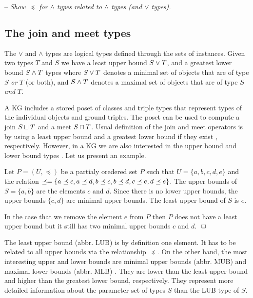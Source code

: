 \documentclass[runningheads]{llncs}
\newcommand{\finbox}{\phantom{.}\hfill\Box}
\newcommand{\memo}[1]{}
\newcommand{\notes}[1]{\noindent\begin{small}-- \emph{#1}\hfill\break\end{small}}
\begin{document}
\notes{Show $\preceq$ for $\land$ types related to $\land$ types (and $\lor$ types).}

\memo{Put together the base types of ground identifiers using $\land$ type.}
\memo{First, the base type of an ground identifier is the $\land$ of all base types.}
\memo{The \emph{base type} of a ground identifier is defined explicitely!}





\subsection{The join and meet types\label{sec:join-meet-types}}

The $\lor$ and $\land$ types are logical types defined through the
sets of instances. Given two types $T$ and $S$ we have a least upper
bound $S\lor\/T$, and a greatest lower bound $S\land\/T$ types where
$S\lor\/T$ denotes a minimal set of objects that are of type $S$
\emph{or} $T$ (or both), and $S\land\/T$ denotes a maximal set of
objects that are of type $S$ \emph{and} $T$.

A KG includes a stored poset of classes and triple types that
represent types of the individual objects and ground triples. The
poset can be used to compute a join $S\sqcup\/T$ and a meet
$S\sqcap\/T$. Usual definition of the join and meet operators is by
using a least upper bound and a greatest lower bound if they exist
\cite{Pierce2002}, respectively. However, in a KG we are also
interested in the upper bound and lower bound types
\cite{DaveyPriestley2002}. Let us present an example.

\begin{example}
  Let $P=(U,\preceq)$ be a partialy oredered set $P$ such that
  $U=\{a,b,c,d,e\}$ and the relation
  $\preceq=\{a\preceq\/c,a\preceq\/d,b\preceq\/c,b\preceq\/d,c\preceq\/e,d\preceq\/e\}$.
  The upper bounds of $S=\{a,b\}$ are the elements $c$ and $d$. Since
  there is no lower upper bounds, the upper bounds $\{c,d\}$ are
  minimal upper bounds. The least upper bound of $S$ is $e$.

  In the case that we remove the element $e$ from $P$ then $P$ does
  not have a least upper bound but it still has two minimal upper
  bounds $c$ and $d$. $\finbox$
\end{example}

The least upper bound (abbr. LUB) is by definition one element. It has
to be related to all upper bounds via the relationship $\preceq$.  On
the other hand, the most interesting upper and lower bounds are
minimal upper bounds (abbr. MUB) and maximal lower bounds (abbr. MLB)
\cite{Knudstorp2024}. They are lower than the least upper bound and
higher than the greatest lower bound, respectively. They represent
more detailed information about the parameter set of types $S$ than
the LUB type of $S$.
\end{document}
